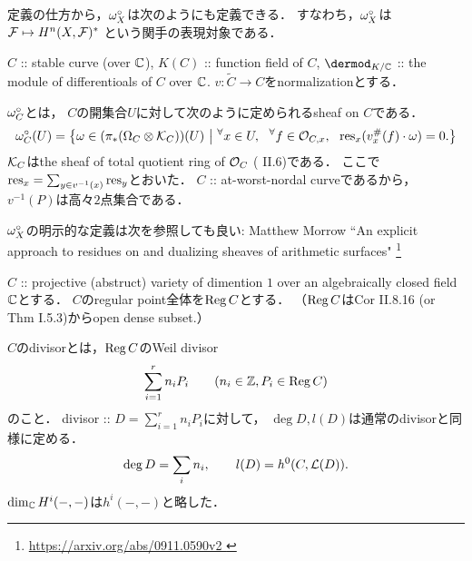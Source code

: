 \documentclass[a4paper]{jsarticle}
\begin{document}
    \begin{Remark}
        定義の仕方から，$\omega^{\circ}_X$は次のようにも定義できる．
        すなわち，$\omega^{\circ}_X$は$\mathcal{F} \mapsto H^n(X, \mathcal{F})^*$
        という関手の表現対象である．
    \end{Remark}

    \begin{Def}
        $C$ :: stable curve (over $\mathbb{C}$),
        $K(C)$ :: function field of $C$,
        $\dermod_{K/\C}$ :: the module of differentioals of $C$ over $\mathbb{C}$.
        $v: \tilde{C} \to C$をnormalizationとする．
        
        $\omega^{\circ}_C$とは，
        $C$の開集合$U$に対して次のように定められるsheaf on $C$である．
        \[
            \shDual_C(U)=
            \left\{
                \omega \in (\pi_*(\shDer_{C} \otimes \shK_{C}))(U)
                \ \middle|\ 
                \Forall{x \in U} \Forall{f \in \shO_{C, x}} \res_x(v^{\#}_x(f) \cdot \omega)=0.
            \right\}
        \]
        $\mathcal{K}_C$はthe sheaf of total quotient ring of $\mathcal{O}_C$ (\cite{HarAG} II.6)である．
        ここで$\operatorname{res}_x=\sum_{y \in v^{-1}(x)} \operatorname{res}_y$とおいた．
        $C$ :: at-worst-nordal curveであるから，
        $v^{-1}(P)$は高々$2$点集合である．
    \end{Def}
    \begin{Remark}
        $\omega^{\circ}_X$の明示的な定義は次を参照しても良い:
        Matthew Morrow
        ``An explicit approach to residues on and dualizing sheaves of arithmetic surfaces"
        \footnote{\url{ https://arxiv.org/abs/0911.0590v2 }}
    \end{Remark}

    \begin{Def} \label{def:DivOfSingCurve}
        $C$ :: projective (abstruct) variety of dimention $1$
        over an algebraically closed field $\mathbb{C}$とする．
        $C$のregular point全体を$\operatorname{Reg} C$とする．
        （$\operatorname{Reg} C$はCor II.8.16 (or Thm I.5.3)からopen dense subset.）

        $C$のdivisorとは，$\operatorname{Reg} C$のWeil divisor
        \[ \sum_{i=1}^{r} n_i P_i \qquad (n_i \in \mathbb{Z}, P_i \in \operatorname{Reg} C) \]
        のこと．
        divisor :: $D=\sum_{i=1}^{r} n_i P_i$に対して，
        $\deg D, l(D)$は通常のdivisorと同様に定める．
        \[ \deg D=\sum_i n_i, \qquad l(D)=h^0(C, \mathcal{L}(D)). \]
        $\dim_{\mathbb{C}} H^i(-,-)$は$h^i(-,-)$と略した．
    \end{Def}
\end{document}

